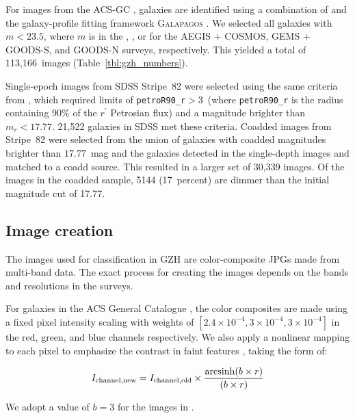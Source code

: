 \documentclass[twocolumn]{aastex6}
\begin{document}
For images from the ACS-GC \citet{gri12}, galaxies are identified using a combination of \sextractor{} \citep{ber96} and the galaxy-profile fitting framework \textsc{Galapagos} \citep{bar12}. We selected all galaxies with $m < 23.5$, where $m$ is in the \Iband, \zband, or \iband{} for the AEGIS + COSMOS, GEMS + GOODS-S, and GOODS-N surveys, respectively. This yielded a total of 113,166~images (Table~\ref{tbl:gzh_numbers}).

Single-epoch images from SDSS Stripe~82 were selected using the same criteria from \citet{wil13}, which required limits of \texttt{petroR90\_r}$ > 3$\arcsec~(where \texttt{petroR90\_r} is the radius containing 90\% of the $r^\prime$ Petrosian flux) and a magnitude brighter than $m_r < 17.77$. 21,522 galaxies in SDSS met these criteria. Coadded images from Stripe~82 were selected from the union of galaxies with coadded magnitudes brighter than $17.77$~mag and the galaxies detected in the single-depth images and matched to a coadd source. This resulted in a larger set of 30,339 images. Of the images in the coadded sample, 5144 (17~percent) are dimmer than the initial magnitude cut of 17.77. 

\subsection{Image creation}

The images used for classification in GZH are color-composite JPGs made from multi-band data. The exact process for creating the images depends on the bands and resolutions in the surveys. 

For galaxies in the ACS General Catalogue \citep[AEGIS, COSMOS, GEMS, 2-epoch GOODS;][]{gri12}, the color composites are made using a fixed pixel intensity scaling with weights of $[2.4\times10^{-4},3\times10^{-4},3\times10^{-4}]$ in the red, green, and blue channels respectively. We also apply a nonlinear mapping to each pixel to emphasize the contrast in faint features \citep{lup04}, taking the form of:

\begin{equation}
I_\mathrm{channel,new} = I_\mathrm{channel,old} \times \frac{\arcsinh(b\times r)}{(b\times r)}
\label{eqn:nonlinear}
\end{equation}

\noindent We adopt a value of $b=3$ for the \hst{} images in \citet{gri12}. 
\end{document}
